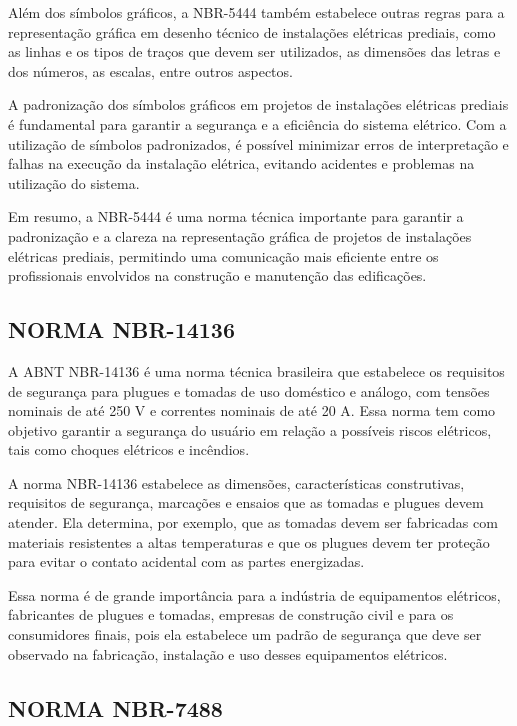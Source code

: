 Além dos símbolos gráficos, a NBR-5444 também estabelece outras regras para a representação gráfica em desenho técnico de instalações elétricas prediais, como as linhas e os tipos de traços que devem ser utilizados, as dimensões das letras e dos números, as escalas, entre outros aspectos.

A padronização dos símbolos gráficos em projetos de instalações elétricas prediais é fundamental para garantir a segurança e a eficiência do sistema elétrico. Com a utilização de símbolos padronizados, é possível minimizar erros de interpretação e falhas na execução da instalação elétrica, evitando acidentes e problemas na utilização do sistema.

Em resumo, a NBR-5444 é uma norma técnica importante para garantir a padronização e a clareza na representação gráfica de projetos de instalações elétricas prediais, permitindo uma comunicação mais eficiente entre os profissionais envolvidos na construção e manutenção das edificações.

\subsection{NORMA NBR-14136}

A ABNT NBR-14136 é uma norma técnica brasileira que estabelece os requisitos de segurança para plugues e tomadas de uso doméstico e análogo, com tensões nominais de até 250 V e correntes nominais de até 20 A. Essa norma tem como objetivo garantir a segurança do usuário em relação a possíveis riscos elétricos, tais como choques elétricos e incêndios.

A norma NBR-14136 estabelece as dimensões, características construtivas, requisitos de segurança, marcações e ensaios que as tomadas e plugues devem atender. Ela determina, por exemplo, que as tomadas devem ser fabricadas com materiais resistentes a altas temperaturas e que os plugues devem ter proteção para evitar o contato acidental com as partes energizadas.

Essa norma é de grande importância para a indústria de equipamentos elétricos, fabricantes de plugues e tomadas, empresas de construção civil e para os consumidores finais, pois ela estabelece um padrão de segurança que deve ser observado na fabricação, instalação e uso desses equipamentos elétricos.

\subsection{NORMA NBR-7488}

